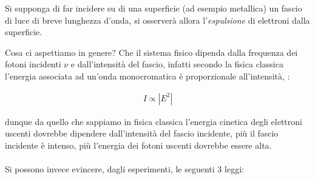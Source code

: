 \begin{myth}
	Si supponga di far incidere su di una superficie (ad esempio metallica) un fascio di luce di breve lunghezza d'onda, si osserverà allora l'\textit{espulsione} di elettroni dalla superficie.
\end{myth}

	Cosa ci aspettiamo in genere? Che il sistema fisico dipenda dalla frequenza dei fotoni incidenti $\nu$ e dall'intensità del fascio, infatti secondo la fisica classica l’energia associata ad un’onda monocromatica è proporzionale all'intensità, : 
	
\begin{align*}
	I \propto |E^2|
\end{align*}
	
	dunque da quello che sappiamo in fisica classica l'energia cinetica degli elettroni uscenti dovrebbe dipendere dall'intensità del fascio incidente, più il fascio incidente è intenso, più l'energia dei fotoni uscenti dovrebbe essere alta.
	\\
	\\
	 Si possono invece evincere, dagli esperimenti, le seguenti $3$ leggi:
	
